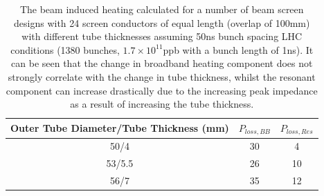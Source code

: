 \begin{table}
\caption{The beam induced heating calculated for a number of beam screen designs with 24 screen conductors of equal length (overlap of 100mm) with different tube thicknesses assuming 50ns bunch spacing LHC conditions (1380 bunches, $1.7\times 10^{11}$ppb with a bunch length of 1ns). It can be seen that the change in broadband heating component does not strongly correlate with the change in tube thickness, whilst the resonant component can increase drastically due to the increasing peak impedance as a result of increasing the tube thickness.}
\label{tab:thickness-heating}
\begin{center}
\begin{tabular}{c | c | c }
Outer Tube Diameter/Tube Thickness (mm)  & $P_{loss, BB}$ & $P_{loss, Res}$ \\ \hline
50/4  & 30 & 4 \\ \hline
53/5.5  & 26 & 10 \\ \hline
56/7  & 35 & 12 \\ 
\end{tabular}
\end{center}
\end{table}

